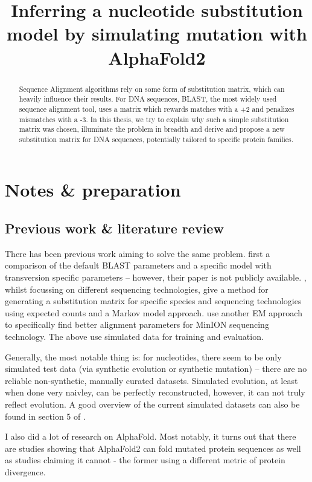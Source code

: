 \documentclass{article}
\title{Inferring a nucleotide substitution model by simulating mutation with AlphaFold2}
\begin{document}
\maketitle

\begin{abstract}
    Sequence Alignment algorithms rely on some form of substitution matrix, which
    can heavily influence their results. For DNA sequences, BLAST, the most widely used sequence alignment tool,
    uses a matrix which rewards matches with a +2 and penalizes mismatches with a -3. In this thesis,
    we try to explain why such a simple substitution matrix was chosen, illuminate the problem in breadth
    and derive and propose a new substitution matrix for DNA sequences, potentially tailored to specific
    protein families.
    \tableofcontents

\end{abstract}



\section{Notes \& preparation}
\subsection{Previous work \& literature review}
There has been previous work aiming to solve the same problem. \textcite{statesImprovedSensitivityNucleic1991}
first a comparison of the default BLAST parameters and a specific model with transversion specific parameters -- however,
their paper is not publicly available. \textcite{hamadaTrainingAlignmentParameters2017}, whilst focussing on different sequencing
technologies, give a method for generating a substitution matrix for specific species and sequencing technologies using
expected counts and a Markov model approach.  \textcite{jainImprovedDataAnalysis2015} use another EM approach to specifically
find better alignment parameters for MinION sequencing technology. The above use simulated data for training and evaluation.
\par
Generally, the most notable thing is: for nucleotides, there seem to be only simulated test data (via synthetic evolution or synthetic mutation)
-- there are no reliable non-synthetic, manually curated datasets. Simulated evolution, at least when done very naivley,
can be perfectly reconstructed, however, it can not truly reflect evolution. A good overview of the current simulated datasets
can also be found in section 5 of \cite{chaoDevelopmentsAlgorithmsSequence2022}.
\par
I also did a lot of research on AlphaFold. Most notably, it turns out that there are studies showing that AlphaFold2 can fold
mutated protein sequences \cite{mcbrideAlphaFold2CanPredict2023} as well as studies claiming it cannot \cite{pakUsingAlphaFoldPredict2021,buelCanAlphaFold2Predict2022} -
the former using a different metric of protein divergence.
\par
\end{document}
